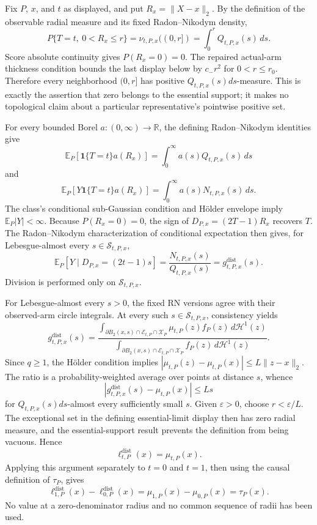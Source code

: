 Fix \(P\), \(x\), and \(t\) as displayed, and put \(R_x=\lVert X-x\rVert_2\).  By the definition of the observable radial measure and its fixed Radon--Nikodym density,
\[
 P\{T=t,\ 0<R_x\leq r\}
 =\nu_{t,P,x}((0,r])
 =\int_0^rQ_{t,P,x}(s)\,ds.
\]
Score absolute continuity gives \(P(R_x=0)=0\).  The repaired actual-arm thickness condition bounds the last display below by \(c_-r^2\) for \(0<r\leq r_0\).  Therefore every neighborhood \((0,r]\) has positive \(Q_{t,P,x}(s)ds\)-measure.  This is exactly the assertion that zero belongs to the essential support; it makes no topological claim about a particular representative's pointwise positive set.

For every bounded Borel \(a:(0,\infty)\to\mathbb R\), the defining Radon--Nikodym identities give
\[
 \mathbb E_P[\mathbf1\{T=t\}a(R_x)]
 =\int_0^\infty a(s)Q_{t,P,x}(s)\,ds
\]
and
\[
 \mathbb E_P[Y\mathbf1\{T=t\}a(R_x)]
 =\int_0^\infty a(s)N_{t,P,x}(s)\,ds.
\]
The class's conditional sub-Gaussian condition and H\"older envelope imply \(\mathbb E_P|Y|<\infty\).  Because \(P(R_x=0)=0\), the sign of \(D_{P,x}=(2T-1)R_x\) recovers \(T\).  The Radon--Nikodym characterization of conditional expectation then gives, for Lebesgue-almost every \(s\in\mathcal S_{t,P,x}\),
\[
 \mathbb E_P[Y\mid D_{P,x}=(2t-1)s]
 =\frac{N_{t,P,x}(s)}{Q_{t,P,x}(s)}
 =g^{\mathrm{dist}}_{t,P,x}(s).
\]
Division is performed only on \(\mathcal S_{t,P,x}\).

For Lebesgue-almost every \(s>0\), the fixed RN versions agree with their observed-arm circle integrals.  At every such \(s\in\mathcal S_{t,P,x}\), consistency yields
\[
 g^{\mathrm{dist}}_{t,P,x}(s)
 =\frac{\int_{\partial B_2(x,s)\cap\mathcal E_{t,P}\cap\mathcal X_P}
 \mu_{t,P}(z)f_P(z)\,d\mathcal H^1(z)}
 {\int_{\partial B_2(x,s)\cap\mathcal E_{t,P}\cap\mathcal X_P}
 f_P(z)\,d\mathcal H^1(z)}.
\]
Since \(q\geq1\), the H\"older condition implies \(|\mu_{t,P}(z)-\mu_{t,P}(x)|\leq L\lVert z-x\rVert_2\).  The ratio is a probability-weighted average over points at distance \(s\), whence
\[
 |g^{\mathrm{dist}}_{t,P,x}(s)-\mu_{t,P}(x)|\leq Ls
\]
for \(Q_{t,P,x}(s)ds\)-almost every sufficiently small \(s\).  Given \(\varepsilon>0\), choose \(r<\varepsilon/L\).  The exceptional set in the defining essential-limit display then has zero radial measure, and the essential-support result prevents the definition from being vacuous.  Hence
\[
 \ell^{\mathrm{dist}}_{t,P}(x)=\mu_{t,P}(x).
\]
Applying this argument separately to \(t=0\) and \(t=1\), then using the causal definition of \(\tau_P\), gives
\[
 \ell^{\mathrm{dist}}_{1,P}(x)-\ell^{\mathrm{dist}}_{0,P}(x)
 =\mu_{1,P}(x)-\mu_{0,P}(x)=\tau_P(x).
\]
No value at a zero-denominator radius and no common sequence of radii has been used.